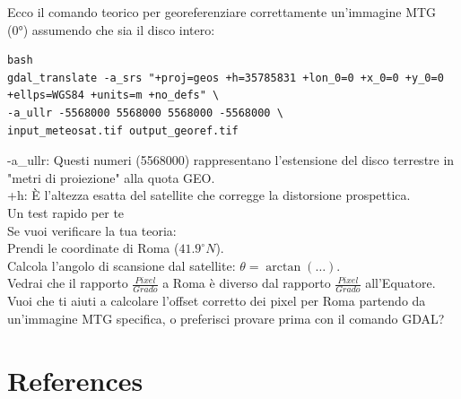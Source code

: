 \documentclass[a4paper,14pt]{article}
\begin{document}
Ecco il comando teorico per georeferenziare correttamente un'immagine MTG (0°) assumendo che sia il disco intero:
{
\scriptsize
\begin{verbatim}
bash
gdal_translate -a_srs "+proj=geos +h=35785831 +lon_0=0 +x_0=0 +y_0=0 +ellps=WGS84 +units=m +no_defs" \
-a_ullr -5568000 5568000 5568000 -5568000 \
input_meteosat.tif output_georef.tif
\end{verbatim}
}
-a\_ullr: Questi numeri (5568000) rappresentano l'estensione del disco terrestre in "metri di proiezione" alla quota GEO.\\
+h: È l'altezza esatta del satellite che corregge la distorsione prospettica.\\
Un test rapido per te\\
Se vuoi verificare la tua teoria:\\
Prendi le coordinate di Roma (\(41.9^{\circ }N\)).\\
Calcola l'angolo di scansione dal satellite: \(\theta =\arctan (\dots )\).\\
Vedrai che il rapporto \(\frac{Pixel}{Grado}\) a Roma è diverso dal rapporto \(\frac{Pixel}{Grado}\) all'Equatore.\\
Vuoi che ti aiuti a calcolare l'offset corretto dei pixel per Roma partendo da un'immagine MTG specifica, o preferisci provare prima con il comando GDAL?
\section{References}
\renewcommand{\section}[2]{\vskip 0.05em} %
\nocite{*} %
{
\small
{}

}
\printindex
\end{document}
